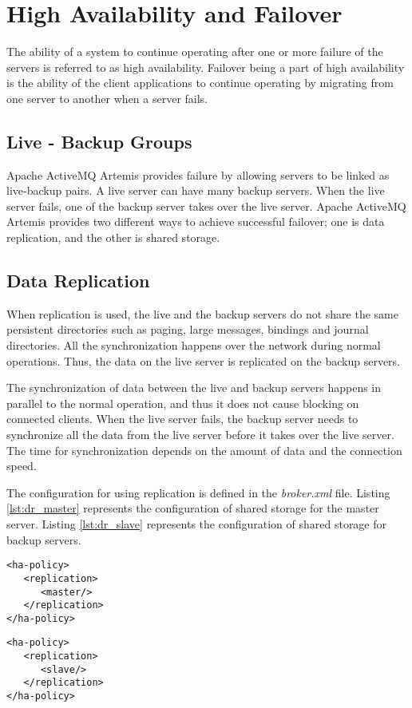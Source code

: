 \section{High Availability and Failover}

The ability of a system to continue operating after one or more failure of the servers is referred to as high availability. Failover being a part of high availability is the ability of the client applications to continue operating by migrating from one server to another when a server fails.

\subsection{Live - Backup Groups}
Apache ActiveMQ Artemis provides failure by allowing servers to be linked as live-backup pairs. A live server can have many backup servers. When the live server fails, one of the backup server takes over the live server. Apache ActiveMQ Artemis provides two different ways to achieve successful failover; one is data replication, and the other is shared storage.

\subsection{Data Replication}

When replication is used, the live and the backup servers do not share the same persistent directories such as paging, large messages, bindings and journal directories. All the synchronization happens over the network during normal operations. Thus, the data on the live server is replicated on the backup servers. 

The synchronization of data between the live and backup servers happens in parallel to the normal operation, and thus it does not cause blocking on connected clients. When the live server fails, the backup server needs to synchronize all the data from the live server before it takes over the live server. The time for synchronization depends on the amount of data and the connection speed. 

The configuration for using replication is defined in the \textit{broker.xml} file. Listing \ref{lst:dr_master} represents the configuration of shared storage for the master server. Listing \ref{lst:dr_slave} represents the configuration of shared storage for backup servers.

\bigskip
\noindent\begin{minipage}{.45\columnwidth}
\begin{lstlisting}[style=XmlInputStyle,caption=HA replication master, label={lst:dr_master}]
<ha-policy>
   <replication>
      <master/>
   </replication>
</ha-policy>
\end{lstlisting}
\end{minipage}\hfill
\begin{minipage}{.45\columnwidth}
\begin{lstlisting}[style=XmlInputStyle,caption=HA replication slave, label={lst:dr_slave}]
<ha-policy>
   <replication>
      <slave/>
   </replication>
</ha-policy>
\end{lstlisting}
\end{minipage}


